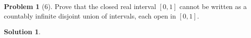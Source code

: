 \documentclass{article}
\theoremstyle{definition}
\newtheorem*{soln}{Solution}
\newtheorem*{prob}{Problem}
\theoremstyle{theorem}
\begin{document}
\begin{prob}[6]
Prove that the closed real interval $[0, 1]$ cannot be written as a countably infinite disjoint union of intervals, each open in $[0, 1]$. 
\end{prob}
\begin{soln}

\end{soln}
\vspace{1in}
\end{document}
